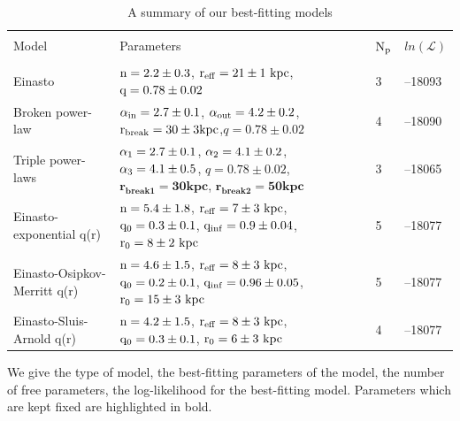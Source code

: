 \documentclass[12pt,preprint]{aastex}
\begin{document}
\begin{table}
\tiny
\begin{threeparttable}
\caption{A summary of our best-fitting models}
\begin{tabularx}{1.1\textwidth}{llll}
\hline\hline \\
Model & Parameters & $\rm N_p$ & $ln(\mathscr{L})$ \\
\hline \\
Einasto & $\rm n=2.2\pm0.3$, $\rm r_{eff}=21\pm1~kpc$, $\rm q=0.78\pm0.02$ & 3 & --18093\\ 
Broken power-law & $\rm \alpha_{in}=2.7\pm0.1$, $\rm \alpha_{out}=4.2\pm0.2$, $\rm r_{break}=30\pm3kpc$,$q=0.78\pm0.02$ & 4 & --18090 \\ 
Triple power-laws & $\rm \alpha_{1}=2.7\pm0.1$, $\rm \alpha_{2}=4.1\pm0.2$, $\rm \alpha_{3}=4.1\pm0.5$, $q=0.78\pm0.02$, $\bm{r_{break1}=30kpc}$, $\bm{r_{break2}=50kpc}$ & 3 & --18065\\  
Einasto-exponential q(r) & $\rm n=5.4\pm1.8$, $\rm r_{eff}=7\pm3~kpc$, $\rm q_0=0.3\pm0.1$, $\rm q_{inf}=0.9\pm0.04$, $\rm r_{0}=8\pm2~kpc$ & 5 & --18077 \\ 
Einasto-Osipkov-Merritt q(r) & $\rm n=4.6\pm1.5$, $\rm r_{eff}=8\pm3~kpc$, $\rm q_0=0.2\pm0.1$, $\rm q_{inf}=0.96\pm0.05$, $\rm r_{0}=15\pm3~kpc$ & 5 & --18077 \\ 
Einasto-Sluis-Arnold q(r) & $\rm n=4.2\pm1.5$, $\rm r_{eff}=8\pm3~kpc$, $\rm q_0=0.3\pm0.1$, $\rm r_{0}=6\pm3~kpc$ & 4 & --18077 \\ 
\hline
\end{tabularx}
\begin{tablenotes}
\item  We give the type of model, the best-fitting parameters of the model, the number of free parameters, the log-likelihood for the best-fitting model. Parameters which are kept fixed are highlighted in bold.
\end{tablenotes}
\end{threeparttable}
\end{table}
\end{document}
